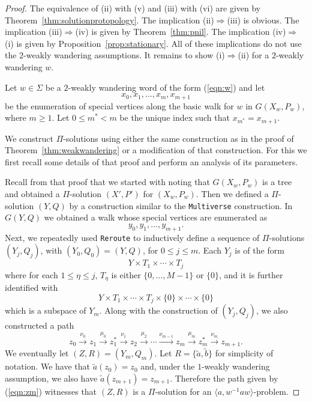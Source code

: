 \documentclass[10pt,a4paper]{amsart}
\theoremstyle{definition}
\theoremstyle{definition}
\numberwithin{equation}{section}
\begin{document}
\begin{proof} The equivalence of (ii) with (v) and (iii) with (vi) are given by Theorem~\ref{thm:solutionprotopology}. The implication (ii)$\Rightarrow$(iii)  is obvious. The implication (iii)$\Rightarrow$(iv) is given by Theorem~\ref{thm:pnil}. The implication (iv)$\Rightarrow$(i) is given by Proposition~\ref{prop:stationary}. All of these implications do not use the $2$-weakly wandering assumptions. It remains to show (i)$\Rightarrow$(ii) for a $2$-weakly wandering $w$.


Let $w\in \Sigma$ be a $2$-weakly wandering word of the form (\ref{eqn:w}) and let
$$ x_0, x_1, \dots, x_m, x_{m+1} $$
be the enumeration of special vertices along the basic walk for $w$ in $G(X_w, P_w)$, where $m\geq 1$. Let $0\leq m^*<m$ be the unique index such that $x_{m^*}=x_{m+1}$. 

We construct $\Pi$-solutions using either the same construction as in the proof of Theorem~\ref{thm:weakwandering} or a modification of that construction.  For this we first recall some details of that proof and perform an analysis of its parameters. 

Recall from that proof that we started with noting that $G(X_w, P_w)$ is a tree and obtained a $\Pi$-solution $(X', P')$ for $(X_w, P_w)$. Then we defined a $\Pi$-solution $(Y, Q)$ by a construction similar to the {\tt Multiverse} construction. In $G(Y, Q)$ we obtained a walk whose special vertices are enumerated as
$$ y_0, y_1, \dots, y_{m+1}. $$
Next, we repeatedly used {\tt Reroute} to inductively define a sequence of $\Pi$-solutions $(Y_j, Q_j)$, with $(Y_0, Q_0)=(Y, Q)$, for $0\leq j\leq m$. Each $Y_j$ is of the form
$$ Y\times T_1\times\cdots \times T_j$$
where for each $1\leq \eta\leq j$, $T_\eta$ is either $\{0, \dots, M-1\}$ or $\{0\}$, and it is further identified with 
$$ Y\times T_1\times \cdots\times T_j\times\{0\}\times\cdots \times\{0\} $$
which is a subspace of $Y_m$. Along with the construction of $(Y_j, Q_j)$, we also constructed a path
\begin{equation}\label{eqn:zm} z_0\stackrel{\nu_0}{\longrightarrow} z_1\stackrel{\mu_0}{\longrightarrow} z_1^*\stackrel{\nu_1}{\longrightarrow} z_2\stackrel{\mu_2}{\longrightarrow}\cdots\stackrel{\nu_{m-1}}{\longrightarrow}z_m\stackrel{\mu_m}{\longrightarrow}z_m^*\stackrel{\nu_m}{\longrightarrow}z_{m+1}. 
\end{equation}
We eventually let $(Z, R)=(Y_m, Q_m)$. Let $R=\{\tilde{a}, \tilde{b}\}$ for simplicity of notation. We have that $\tilde{a}(z_0)=z_0$ and, under the $1$-weakly wandering assumption, we also have $\tilde{a}(z_{m+1})=z_{m+1}$. Therefore the path given by (\ref{eqn:zm}) witnesses that $(Z, R)$ is a $\Pi$-solution for an $\langle a, w^{-1}aw\rangle$-problem.


\end{proof}
\end{document}
